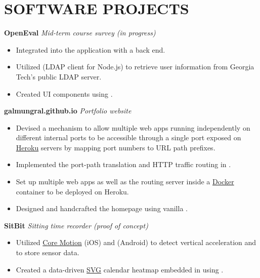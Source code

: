 \documentclass[11pt]{article}
\begin{document}
\section*{SOFTWARE PROJECTS \hfill \color{gray}{//github.com/GalMunGral}}
\textbf{OpenEval} \enspace \textit{\color{gray} Mid-term course survey (in progress)}
\begin{itemize}[leftmargin=15pt, noitemsep, topsep=0pt]
\item Integrated \underline{} into the \underline{} application with a \underline{} back end.
\item Utilized \underline{} (LDAP client for Node.js) to retrieve user information from Georgia Tech's public LDAP server.
\item Created UI components using \underline{}.
\end{itemize}
\vspace{0.5em}
%
\textbf{galmungral.github.io}  \enspace \textit{\color{gray} Portfolio website}
\begin{itemize}[leftmargin=15pt, noitemsep, topsep=0pt]
\item Devised a mechanism to allow multiple web apps running independently on different internal ports to be accessible through a single port exposed on \underline{Heroku} servers by mapping port numbers to URL path prefixes.
\item Implemented the port-path translation and HTTP traffic routing in \underline{}.
\item Set up multiple web apps as well as the routing server inside a \underline{Docker} container to be deployed on Heroku.
\item Designed and handcrafted the homepage using vanilla \underline{}.
\end{itemize}
\vspace{0.5em}
%
\textbf{SitBit} \enspace \textit{\color{gray} Sitting time recorder (proof of concept)} 
\begin{itemize}[leftmargin=15pt, noitemsep, topsep=0pt]
\item Utilized \underline{Core Motion} (iOS) and \underline{} (Android) to detect vertical acceleration and \underline{} to store sensor data.
\item Created a data-driven \underline{SVG} calendar heatmap embedded in \underline{} using \underline{}.
\end{itemize}
\end{document}
